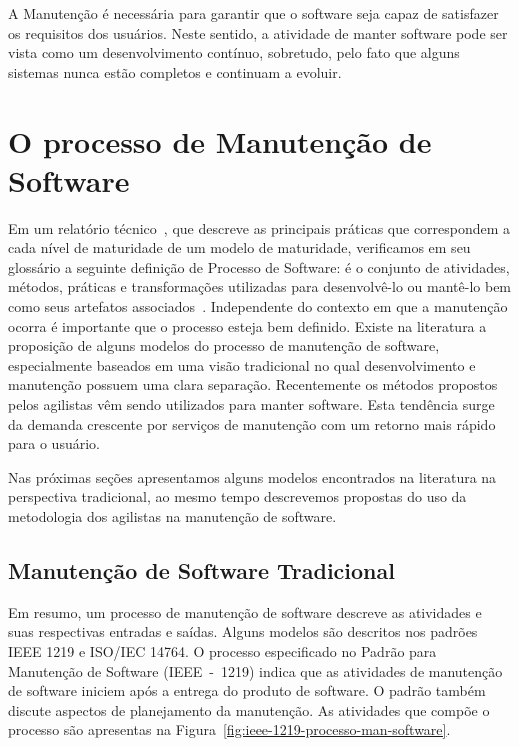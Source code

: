 A Manutenção é necessária para garantir que o software seja capaz de satisfazer
os requisitos dos usuários. Neste sentido, a atividade de manter software pode
ser vista como um desenvolvimento contínuo, sobretudo, pelo fato que alguns
sistemas nunca estão completos e continuam a evoluir.

\section{O processo de Manutenção de Software}
\label{sec:o_processo_de_manutecao_de_software}

Em um relatório técnico~\cite{paulk1993key}, que descreve as principais práticas
que correspondem a cada nível de maturidade de um modelo de maturidade,
verificamos em seu glossário a seguinte definição de Processo de Software: é o
conjunto de atividades, métodos, práticas e transformações utilizadas para
desenvolvê-lo ou mantê-lo bem como seus artefatos
associados~\cite{paulk1993key}. Independente do contexto em que a manutenção
ocorra é importante que o processo esteja bem definido. Existe na literatura a
proposição de alguns modelos do processo de manutenção de software,
especialmente baseados em uma visão tradicional no qual desenvolvimento e
manutenção possuem uma clara separação. Recentemente os métodos propostos pelos
agilistas vêm sendo utilizados para manter software.  Esta tendência surge da
demanda crescente por serviços de manutenção com um retorno mais rápido para o
usuário.
\todoend

Nas próximas seções apresentamos alguns modelos encontrados na literatura na
perspectiva tradicional, ao mesmo tempo descrevemos propostas do uso da
metodologia dos agilistas na manutenção de software.

\subsection{Manutenção de Software Tradicional}
\label{subsec:manutenção_de_software_tradicional}

Em resumo, um processo de manutenção de software descreve as atividades e suas
respectivas entradas e saídas. Alguns modelos são descritos nos padrões IEEE
1219 e ISO/IEC 14764. O processo especificado no Padrão para Manutenção de
Software (IEEE~-~1219) indica que as atividades de manutenção de software iniciem
após a entrega do produto de software. O padrão também discute aspectos de
planejamento da manutenção. As atividades que compõe o processo são apresentas
na Figura~\ref{fig:ieee-1219-processo-man-software}.

